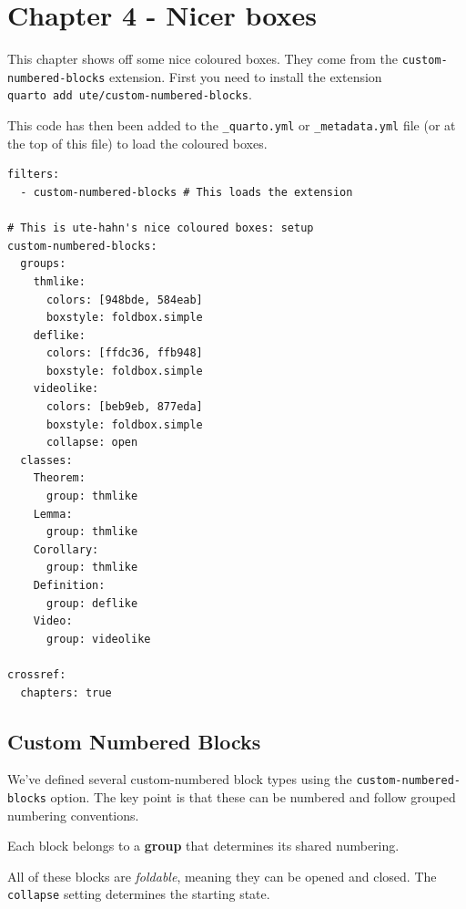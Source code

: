 \documentclass[
  a4paper,
  DIV=11,
  numbers=noendperiod,
  oneside]{scrreport}
\author{}
\date{}
\begin{document}
\chapter{Chapter 4 - Nicer boxes}\label{chapter-4---nicer-boxes}

This chapter shows off some nice coloured boxes. They come from the
\texttt{custom-numbered-blocks} extension. First you need to install the
extension \texttt{quarto\ add\ ute/custom-numbered-blocks}.

This code has then been added to the \texttt{\_quarto.yml} or
\texttt{\_metadata.yml} file (or at the top of this file) to load the
coloured boxes.

\begin{verbatim}
filters:
  - custom-numbered-blocks # This loads the extension

# This is ute-hahn's nice coloured boxes: setup
custom-numbered-blocks:
  groups:
    thmlike:
      colors: [948bde, 584eab]
      boxstyle: foldbox.simple
    deflike:
      colors: [ffdc36, ffb948]
      boxstyle: foldbox.simple
    videolike:
      colors: [beb9eb, 877eda]
      boxstyle: foldbox.simple
      collapse: open
  classes:
    Theorem:
      group: thmlike
    Lemma:
      group: thmlike
    Corollary:
      group: thmlike
    Definition:
      group: deflike
    Video:
      group: videolike
      
crossref:
  chapters: true
\end{verbatim}

\section{Custom Numbered Blocks}\label{custom-numbered-blocks}

We've defined several custom-numbered block types using the
\texttt{custom-numbered-blocks} option. The key point is that these can
be numbered and follow grouped numbering conventions.

Each block belongs to a \textbf{group} that determines its shared
numbering.

All of these blocks are \emph{foldable}, meaning they can be opened and
closed. The \texttt{collapse} setting determines the starting state.
\end{document}
